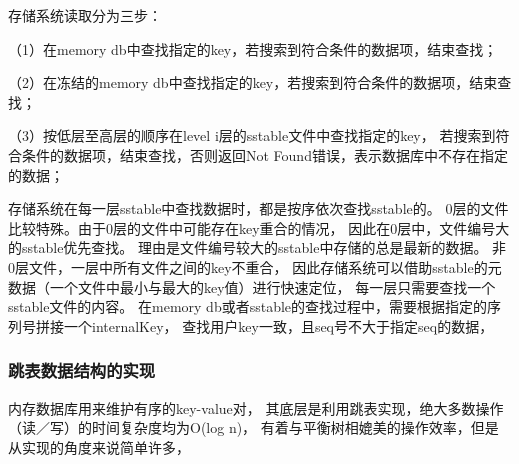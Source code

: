 \begin{enumerate}
		存储系统读取分为三步：

		（1）在memory db中查找指定的key，若搜索到符合条件的数据项，结束查找；

		（2）在冻结的memory db中查找指定的key，若搜索到符合条件的数据项，结束查找；
		
		（3）按低层至高层的顺序在level i层的sstable文件中查找指定的key，
		若搜索到符合条件的数据项，结束查找，否则返回Not Found错误，表示数据库中不存在指定的数据；
		
		存储系统在每一层sstable中查找数据时，都是按序依次查找sstable的。
		0层的文件比较特殊。由于0层的文件中可能存在key重合的情况，
		因此在0层中，文件编号大的sstable优先查找。
		理由是文件编号较大的sstable中存储的总是最新的数据。
		非0层文件，一层中所有文件之间的key不重合，
		因此存储系统可以借助sstable的元数据（一个文件中最小与最大的key值）进行快速定位，
		每一层只需要查找一个sstable文件的内容。
		在memory db或者sstable的查找过程中，需要根据指定的序列号拼接一个internalKey，
		查找用户key一致，且seq号不大于指定seq的数据，
		
		\end{enumerate}
	
		\subsubsection{跳表数据结构的实现}

		内存数据库用来维护有序的key-value对，
		其底层是利用跳表实现，绝大多数操作（读／写）的时间复杂度均为O(log n)，
		有着与平衡树相媲美的操作效率，但是从实现的角度来说简单许多，


